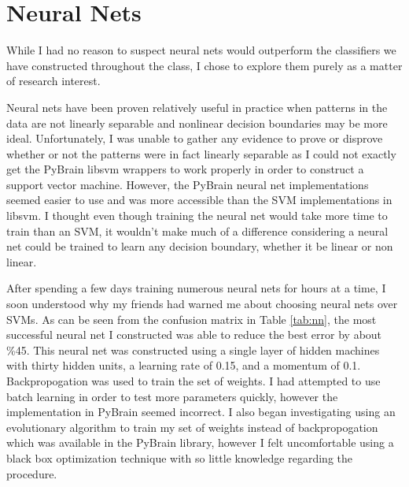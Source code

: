 \documentclass[12pt]{article}
\begin{document}
\section{Neural Nets}

While I had no reason to suspect neural nets would outperform the classifiers
we have constructed throughout the class, I chose to explore them purely as a
matter of research interest.     

Neural nets have been proven relatively useful in practice when patterns in the
data are not linearly separable and nonlinear decision boundaries may be more
ideal. Unfortunately, I was unable to gather any evidence to prove or disprove
whether or not the patterns were in fact linearly separable as I could not
exactly get the PyBrain\cite{website:pybrain} libsvm wrappers to work properly
in order to construct a support vector machine. However, the PyBrain neural net
implementations seemed easier to use and was more accessible than the SVM
implementations in libsvm. I thought even though training the neural net would
take more time to train than an SVM, it wouldn't make much of a difference
considering a neural net could be trained to learn any decision boundary,
whether it be linear or non linear. 

After spending a few days training numerous neural nets for hours at a time, I
soon understood why my friends had warned me about choosing neural nets over
SVMs. As can be seen from the confusion matrix in Table \ref{tab:nn}, the most
successful neural net I constructed was able to reduce the best error by about
\%45. This neural net was constructed using a single layer of hidden machines
with thirty hidden units, a learning rate of 0.15, and a momentum of 0.1.
Backpropogation was used to train the set of weights. I had attempted to use
batch learning in order to test more parameters quickly, however the
implementation in PyBrain seemed incorrect. I also began investigating using an
evolutionary algorithm to train my set of weights instead of backpropogation
which was available in the PyBrain library, however I felt uncomfortable using
a black box optimization technique with so little knowledge regarding the
procedure.
\end{document}
